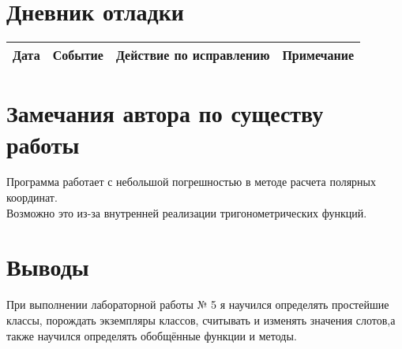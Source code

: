 \documentclass[12pt]{article}
\begin{document}
\pagebreak
\section{Дневник отладки}
\begin{tabular}{|p{50pt}|p{80pt}|p{140pt}|p{140pt}|}
\hline
Дата & Событие & Действие по исправлению & Примечание \\
\hline
\end{tabular}

\section{Замечания автора по существу работы}
Программа работает с небольшой погрешностью в методе расчета полярных координат.\\
Возможно это из-за внутренней реализации тригонометрических функций.


\section{Выводы}
При выполнении лабораторной работы № 5 я научился определять простейшие классы, порождать экземпляры классов, считывать и изменять значения слотов,а также научился определять обобщённые функции и методы.
\end{document}
